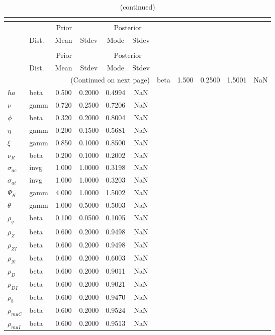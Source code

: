  
\begin{center}
\begin{longtable}{llcccc} 
\caption{Results from posterior maximization (parameters)}\\
 \label{Table:Posterior:1}\\
\toprule 
  & \multicolumn{3}{c}{Prior}  &  \multicolumn{2}{c}{Posterior} \\
  \cmidrule(r{.75em}){2-4} \cmidrule(r{.75em}){5-6}
  & Dist. & Mean  & Stdev & Mode & Stdev \\ 
\midrule \endfirsthead 
\caption{(continued)}\\
 \bottomrule 
  & \multicolumn{3}{c}{Prior}  &  \multicolumn{2}{c}{Posterior} \\
  \cmidrule(r{.75em}){2-4} \cmidrule(r{.75em}){5-6}
  & Dist. & Mean  & Stdev & Mode & Stdev \\ 
\midrule \endhead 
\bottomrule \multicolumn{6}{r}{(Continued on next page)}\endfoot 
\bottomrule\endlastfoot 
${\sigma}$ & beta &   1.500 & 0.2500 &   1.5001 &     NaN \\ 
${ha}$ & beta &   0.500 & 0.2000 &   0.4994 &     NaN \\ 
$\nu$ & gamm &   0.720 & 0.2500 &   0.7206 &     NaN \\ 
${\phi}$ & beta &   0.320 & 0.2000 &   0.8004 &     NaN \\ 
${\eta}$ & gamm &   0.200 & 0.1500 &   0.5681 &     NaN \\ 
$\xi$ & gamm &   0.850 & 0.1000 &   0.8500 &     NaN \\ 
${\nu_R}$ & beta &   0.200 & 0.1000 &   0.2002 &     NaN \\ 
${\sigma_{ac}}$ & invg &   1.000 & 1.0000 &   0.3198 &     NaN \\ 
${\sigma_{ai}}$ & invg &   1.000 & 1.0000 &   0.3203 &     NaN \\ 
${\Psi_{K}}$ & gamm &   4.000 & 1.0000 &   1.5002 &     NaN \\ 
${\theta}$ & gamm &   1.000 & 0.5000 &   0.5003 &     NaN \\ 
${\rho_g}$ & beta &   0.100 & 0.0500 &   0.1005 &     NaN \\ 
${\rho_Z}$ & beta &   0.600 & 0.2000 &   0.9498 &     NaN \\ 
${\rho_{ZI}}$ & beta &   0.600 & 0.2000 &   0.9498 &     NaN \\ 
${\rho_N}$ & beta &   0.600 & 0.2000 &   0.6003 &     NaN \\ 
${\rho_D}$ & beta &   0.600 & 0.2000 &   0.9011 &     NaN \\ 
${\rho_{DI}}$ & beta &   0.600 & 0.2000 &   0.9021 &     NaN \\ 
${\rho_b}$ & beta &   0.600 & 0.2000 &   0.9470 &     NaN \\ 
${\rho_{muC}}$ & beta &   0.600 & 0.2000 &   0.9524 &     NaN \\ 
${\rho_{muI}}$ & beta &   0.600 & 0.2000 &   0.9513 &     NaN \\ 
\end{longtable}
 \end{center}

